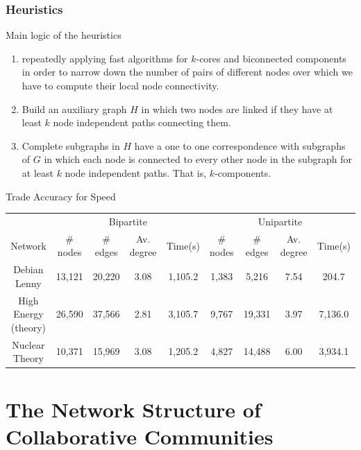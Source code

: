 \documentclass[ignorenonframetext,red,8pt,notes=hide]{beamer}
\begin{document}
\begin{frame}
\frametitle{Heuristics}

\begin{block}{Main logic of the heuristics}

\begin{enumerate}

\item repeatedly applying fast algorithms for $k$-cores \citep{batagelj:2011} and biconnected components \citep{tarjan:1972} in order to narrow down the number of pairs of different nodes over which we have to compute their local node connectivity.

\item Build an auxiliary graph $H$ in which two nodes are linked if they have at least $k$ node independent paths connecting them.

\item Complete subgraphs in $H$ have a one to one correspondence with subgraphs of $G$ in which each node is connected to every other node in the subgraph for at least $k$ node independent paths. That is, $k$-components.

\end{enumerate}
\end{block}

\pause

\begin{block}{Trade Accuracy for Speed}
\begin{tiny}
\begin{tabular}{|c|c|c|c|c|c|c|c|c|}
\hline
&\multicolumn{4}{|c|}{Bipartite}&\multicolumn{4}{|c|}{Unipartite}\\
Network&\# nodes&\# edges&Av. degree&Time(s)&\# nodes&\# edges&Av. degree&Time(s)\\
\hline
Debian Lenny&13,121&20,220&3.08&1,105.2&1,383&5,216&7.54&204.7\\
High Energy (theory)&26,590&37,566&2.81&3,105.7&9,767&19,331&3.97&7,136.0\\
Nuclear Theory&10,371&15,969&3.08&1,205.2&4,827&14,488&6.00&3,934.1\\
\hline
\end{tabular}
\end{tiny}
\end{block}

\end{frame}



\section{The Network Structure of Collaborative Communities}
\end{document}
